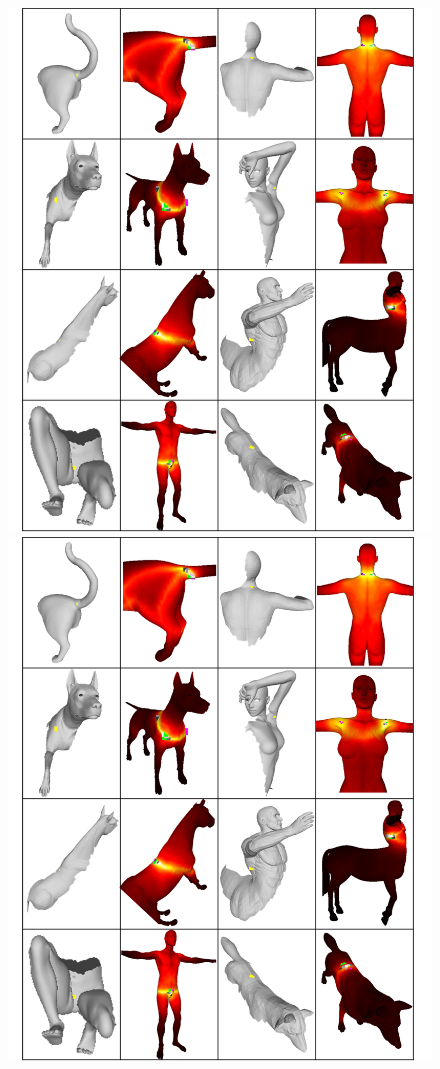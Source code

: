 \documentclass[10pt,twocolumn,letterpaper]{article}
\begin{document}
\begin{figure}[htb]
	\centering
	\ifpdf
	\includegraphics[width=1\textwidth]{figures/success.png}
	\else
	\includegraphics[width=1\textwidth]{figures/success.png}

\end{figure}
\end{document}
